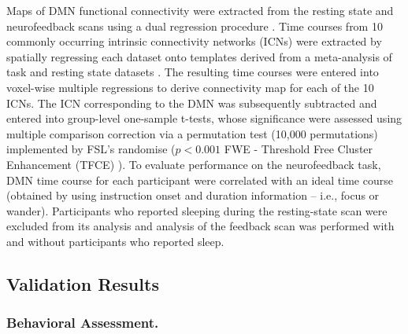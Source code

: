 Maps of DMN functional connectivity were extracted from the resting state and neurofeedback scans using a dual regression procedure \cite{Filippini2009}. Time courses from 10 commonly occurring intrinsic connectivity networks (ICNs) were extracted by spatially regressing each dataset onto templates derived from a meta-analysis of task and resting state datasets \cite{Smith2009}. The resulting time courses were entered into voxel-wise multiple regressions to derive connectivity map for each of the 10 ICNs. The ICN corresponding to the DMN was subsequently subtracted and entered into group-level one-sample t-tests, whose significance were assessed using multiple comparison correction via a permutation test (10,000 permutations) implemented by FSL’s randomise ($p<0.001$ FWE - Threshold Free Cluster Enhancement (TFCE) \cite{Salimi-Khorshidi2011}). To evaluate performance on the neurofeedback task, DMN time course for each participant were correlated with an ideal time course (obtained by using instruction onset and duration information – i.e., focus or wander). Participants who reported sleeping during the resting-state scan were excluded from its analysis and analysis of the feedback scan was performed with and without participants who reported sleep.

\subsection{Validation Results}

\subsubsection{Behavioral Assessment.}

